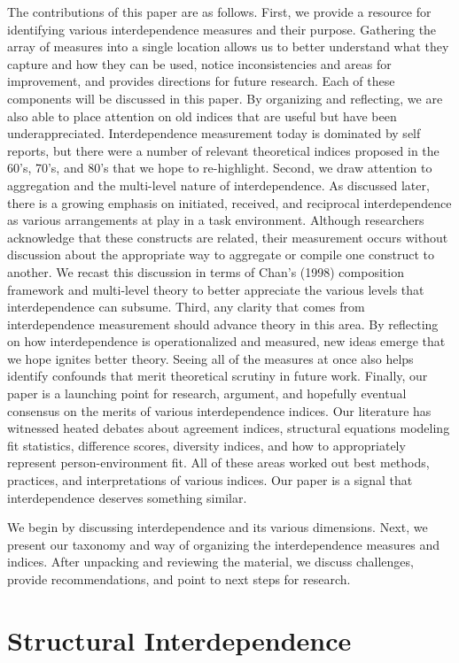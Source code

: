 \documentclass[english,,man]{apa6}
\theoremstyle{definition}
\theoremstyle{definition}
\theoremstyle{definition}
\theoremstyle{remark}
\begin{document}
The contributions of this paper are as follows. First, we provide a
resource for identifying various interdependence measures and their
purpose. Gathering the array of measures into a single location allows
us to better understand what they capture and how they can be used,
notice inconsistencies and areas for improvement, and provides
directions for future research. Each of these components will be
discussed in this paper. By organizing and reflecting, we are also able
to place attention on old indices that are useful but have been
underappreciated. Interdependence measurement today is dominated by self
reports, but there were a number of relevant theoretical indices
proposed in the 60's, 70's, and 80's that we hope to re-highlight.
Second, we draw attention to aggregation and the multi-level nature of
interdependence. As discussed later, there is a growing emphasis on
initiated, received, and reciprocal interdependence as various
arrangements at play in a task environment. Although researchers
acknowledge that these constructs are related, their measurement occurs
without discussion about the appropriate way to aggregate or compile one
construct to another. We recast this discussion in terms of Chan's
(1998) composition framework and multi-level theory to better appreciate
the various levels that interdependence can subsume. Third, any clarity
that comes from interdependence measurement should advance theory in
this area. By reflecting on how interdependence is operationalized and
measured, new ideas emerge that we hope ignites better theory. Seeing
all of the measures at once also helps identify confounds that merit
theoretical scrutiny in future work. Finally, our paper is a launching
point for research, argument, and hopefully eventual consensus on the
merits of various interdependence indices. Our literature has witnessed
heated debates about agreement indices, structural equations modeling
fit statistics, difference scores, diversity indices, and how to
appropriately represent person-environment fit. All of these areas
worked out best methods, practices, and interpretations of various
indices. Our paper is a signal that interdependence deserves something
similar.

We begin by discussing interdependence and its various dimensions. Next,
we present our taxonomy and way of organizing the interdependence
measures and indices. After unpacking and reviewing the material, we
discuss challenges, provide recommendations, and point to next steps for
research.

\hypertarget{structural-interdependence}{%
\section{Structural Interdependence}\label{structural-interdependence}}
\end{document}
